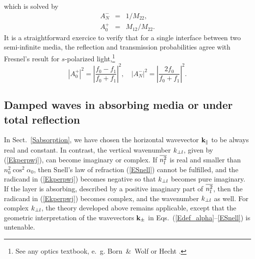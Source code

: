 which is solved by
\begin{equation}
  \begin{array}{lcl}
    A^-_N &=& 1/M_{22},\\[.2ex]
    A^+_0 &=& M_{12}/M_{22}.
  \end{array}
\end{equation}
It is a straightforward exercice to verify
that for a single interface between two semi-infinite media,
the reflection and transmission probabilities
agree with Fresnel's result for $s$-polarized light,\footnote
{See any optics textbook, e.~g. Born~\&~Wolf \cite[ch.~1.5.2]{BoWo99}
  or Hecht \cite[ch.~4.6.2]{Hec02}.}
\begin{equation}
  \left| A^+_0\right|^2
  = \left|\frac{f_0-f_1}{f_0+f_1}\right|^2,
  \quad
  \left| A^-_N\right|^2
  = \left| \frac{2f_0}{f_0+f_1}\right|^2.
\end{equation}


\subsection{Damped waves in absorbing media
  or under total reflection}\label{s:complex}

In Sect.~\ref{Sabsorption},
we have chosen the horizontal wavevector $\mathbf{k}_{\parallel}$
to be always real and constant.
In contrast, the vertical wavenumber $k_{\perp l}$,
given by (\ref{Ekperpwj}),
can become imaginary or complex.
If $\overline{n_l^2}$ is real and smaller than~$n_0^2\cos^2\alpha_0$,
then Snell's law of refraction (\ref{ESnell}) cannot be fulfilled,
and the radicand in (\ref{Ekperpwj}) becomes negative
so that $k_{\perp l}$ becomes pure imaginary.
%
If the layer is absorbing,
described by a positive imaginary part of $\overline{n_l^2}$,
then the radicand in (\ref{Ekperpwj}) becomes complex,
and the wavenumber $k_{\perp l}$ as well.
For complex $k_{\perp l}$,
the theory developed above remains applicable,
except that the geometric interpretation of the wavevectors $\mathbf{k}_\pm$
in Eqs.~(\ref{Edef_alpha}--\ref{ESnell}) is untenable.

